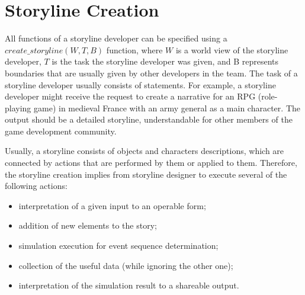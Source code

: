 \section{Storyline Creation}

All functions of a storyline developer can be specified using a\linebreak \(create\_storyline(W, T, B)\) function, where $W$ is a world view of the storyline developer, $T$ is the task the storyline developer was given, and B represents boundaries that are usually given by other developers in the team.
 The task of a storyline developer usually consists of statements.
 For example, a storyline developer might receive the request to create a narrative for an RPG (role-playing game) in medieval France with an army general as a main character. The output should be a detailed storyline, understandable for other members of the game development community.

Usually, a storyline consists of objects and characters descriptions, which are connected by actions that are performed by them or applied to them. Therefore, the storyline creation implies from storyline designer to execute several of the following actions:
\begin{itemize}
 \item interpretation of a given input to an operable form;
 \item addition of new elements to the story;
 \item simulation execution for event sequence determination;
 \item collection of the useful data (while ignoring the other one);
 \item interpretation of the simulation result to a shareable output.
\end{itemize}

